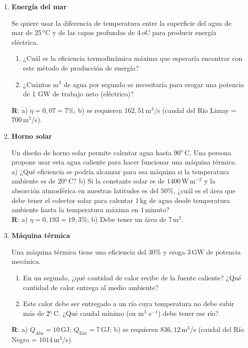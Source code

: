\documentclass[a4paper,12pt]{article}
\begin{document}
\begin{enumerate}
	\item {\bf{Energía del mar}}
		
		Se quiere usar la diferencia de temperatura entre la superficie del
		agua de mar de 25\,$^\mathrm{o}$C y de las capas profundas de
		4\,$\mathrm{o}$C para producir energía eléctrica.
		\begin{enumerate}
			\item ¿Cuál es la eficiencia termodinámica máxima que esperaría
				encontrar con este método de producción de energía?
			\item ¿Cuántos m$^3$ de agua por segundo se necesitaría para
				erogar una potencia de 1 GW de trabajo neto (eléctrico)?
		\end{enumerate}
		{\bf{R}}: a) $\eta=0,07 = 7\%$; b) se requieren $162,51$\,m$^3$/s
		(caudal del Río Limay = $700$\,m$^3$/s). 

	\item {\bf{Horno solar}}
		
		Un diseño de horno solar permite calentar agua hasta
		90$^\mathrm{o}$\,C. Una persona propone usar esta agua caliente para
		hacer funcionar una máquina térmica. a) ¿Qué eficiencia se podría alcanzar
		para esa máquina si la temperatura ambiente es de 20$^\mathrm{o}$\,C?
		b) Si la constante solar es de $1400$\,W\,m$^{-2}$ y la absorción atmosférica
		en nuestras latitudes es del $50\%$, ¿cuál es el área que debe tener el
		colector solar para calentar $1$\,kg de agua desde temperatura ambiente
		hasta la temperatura máxima en $1$\,minuto?
		\\{\bf{R}}: a) $\eta=0,193 = 19,3\%$; b) Debe tener un área de
		$7$\,m$^2$. 
	
	\item {\bf{Máquina térmica}}
		
		Una máquina térmica tiene una eficiencia del 30\% y eroga $3$\,GW de
		potencia mecánica.
		\begin{enumerate}
			\item En un segundo, ¿qué cantidad de calor recibe de la fuente
				caliente? ¿Qué cantidad de calor entrega al medio ambiente?
			\item Este calor debe ser entregado a un río cuya temperatura no
				debe subir más de 2$^\mathrm{o}$\,C. ¿Qué caudal mínimo (en
				m$^3$ s$^{-1}$) debe tener ese río?
		\end{enumerate}
		{\bf{R}}: a) $Q_{\mathrm{Abs}}=10$\,GJ; $Q_{\mathrm{Ent}}=7$\,GJ; b) se
		requieren $836,12$\,m$^3$/s (caudal del Río Negro = $1014$\,m$^3$/s). 
	

\end{enumerate}
\end{document}
